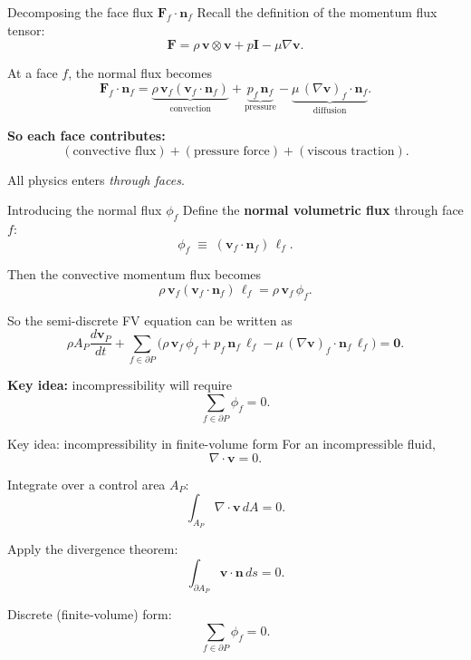 \documentclass[aspectratio=169]{beamer}
\begin{document}
\begin{frame}{Decomposing the face flux $\mathbf{F}_f\cdot\mathbf{n}_f$}
Recall the definition of the momentum flux tensor:
\[
\mathbf{F}
=
\rho\,\mathbf{v}\otimes\mathbf{v}
+
p\mathbf{I}
-
\mu\nabla\mathbf{v}.
\]

\bigskip
At a face $f$, the normal flux becomes
\[
\mathbf{F}_f\cdot\mathbf{n}_f
=
\underbrace{\rho\,\mathbf{v}_f(\mathbf{v}_f\cdot\mathbf{n}_f)}_{\text{convection}}
+
\underbrace{p_f\,\mathbf{n}_f}_{\text{pressure}}
-
\underbrace{\mu\,(\nabla\mathbf{v})_f\cdot\mathbf{n}_f}_{\text{diffusion}}.
\]

\bigskip
\textbf{So each face contributes:}
\[
(\text{convective flux})
+
(\text{pressure force})
+
(\text{viscous traction}).
\]

\bigskip
All physics enters \emph{through faces}.
\end{frame}

\begin{frame}{Introducing the normal flux $\phi_f$}
Define the \textbf{normal volumetric flux} through face $f$:
\[
\phi_f
\;\equiv\;
(\mathbf{v}_f \cdot \mathbf{n}_f)\,\ell_f.
\]

\bigskip
Then the convective momentum flux becomes
\[
\rho\,\mathbf{v}_f(\mathbf{v}_f\cdot\mathbf{n}_f)\,\ell_f
=
\rho\,\mathbf{v}_f\,\phi_f.
\]

\bigskip
So the semi-discrete FV equation can be written as
\[
\rho A_P \frac{d\mathbf{v}_P}{dt}
+
\sum_{f\in\partial P}
\Big(
\rho\,\mathbf{v}_f\,\phi_f
+
p_f\,\mathbf{n}_f\,\ell_f
-
\mu\,(\nabla\mathbf{v})_f\cdot\mathbf{n}_f\,\ell_f
\Big)
=
\mathbf{0}.
\]

\bigskip
\textbf{Key idea:} incompressibility will require
\[
\sum_{f\in\partial P} \phi_f = 0.
\]
\end{frame}

\begin{frame}{Key idea: incompressibility in finite-volume form}
For an incompressible fluid,
\[
\nabla \cdot \mathbf{v} = 0.
\]

\bigskip
Integrate over a control area $A_P$:
\[
\int_{A_P} \nabla \cdot \mathbf{v}\, dA = 0.
\]

\bigskip
Apply the divergence theorem:
\[
\int_{\partial A_P} \mathbf{v}\cdot \mathbf{n}\, ds = 0.
\]

\bigskip
Discrete (finite-volume) form:
\[
\boxed{
\sum_{f\in\partial P} \phi_f = 0.
}
\]

\end{frame}
\end{document}
